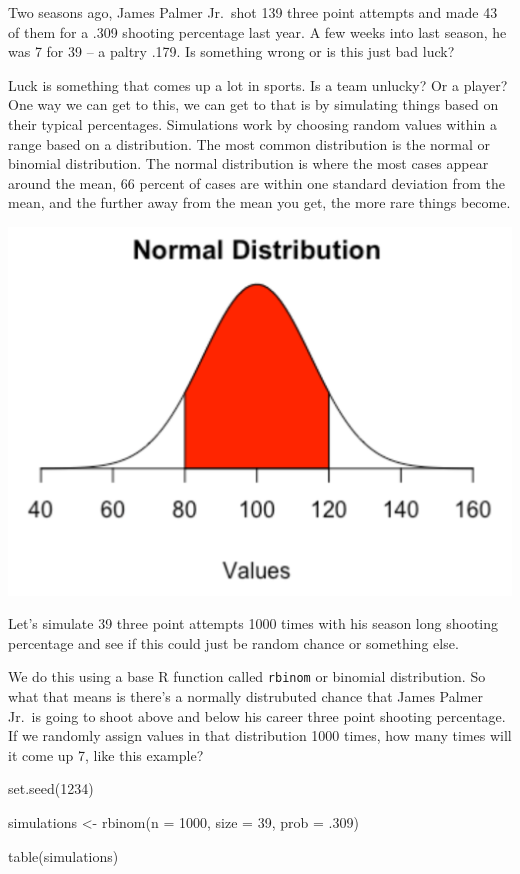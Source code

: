 \documentclass[
]{book}
\newenvironment{Shaded}{\begin{snugshade}}{\end{snugshade}}
\newcommand{\AttributeTok}[1]{\textcolor[rgb]{0.77,0.63,0.00}{#1}}
\newcommand{\DecValTok}[1]{\textcolor[rgb]{0.00,0.00,0.81}{#1}}
\newcommand{\FunctionTok}[1]{\textcolor[rgb]{0.00,0.00,0.00}{#1}}
\newcommand{\NormalTok}[1]{#1}
\newcommand{\OtherTok}[1]{\textcolor[rgb]{0.56,0.35,0.01}{#1}}
\begin{document}
Two seasons ago, James Palmer Jr.~shot 139 three point attempts and made 43 of them for a .309 shooting percentage last year. A few weeks into last season, he was 7 for 39 -- a paltry .179. Is something wrong or is this just bad luck?

Luck is something that comes up a lot in sports. Is a team unlucky? Or a player? One way we can get to this, we can get to that is by simulating things based on their typical percentages. Simulations work by choosing random values within a range based on a distribution. The most common distribution is the normal or binomial distribution. The normal distribution is where the most cases appear around the mean, 66 percent of cases are within one standard deviation from the mean, and the further away from the mean you get, the more rare things become.

\includegraphics[width=17.64in]{images/simulations2}

Let's simulate 39 three point attempts 1000 times with his season long shooting percentage and see if this could just be random chance or something else.

We do this using a base R function called \texttt{rbinom} or binomial distribution. So what that means is there's a normally distrubuted chance that James Palmer Jr.~is going to shoot above and below his career three point shooting percentage. If we randomly assign values in that distribution 1000 times, how many times will it come up 7, like this example?

\begin{Shaded}
\begin{Highlighting}[]
\FunctionTok{set.seed}\NormalTok{(}\DecValTok{1234}\NormalTok{)}

\NormalTok{simulations }\OtherTok{\textless{}{-}} \FunctionTok{rbinom}\NormalTok{(}\AttributeTok{n =} \DecValTok{1000}\NormalTok{, }\AttributeTok{size =} \DecValTok{39}\NormalTok{, }\AttributeTok{prob =}\NormalTok{ .}\DecValTok{309}\NormalTok{)}

\FunctionTok{table}\NormalTok{(simulations)}
\end{Highlighting}
\end{Shaded}
\end{document}
